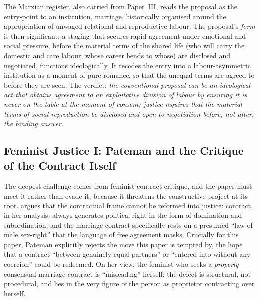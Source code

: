 \documentclass[11pt,a4paper]{article}
\begin{document}
The Marxian register, also carried from Paper~III, reads the proposal as the entry-point to an institution, marriage, historically organised around the appropriation of unwaged relational and reproductive labour. The proposal's \emph{form} is then significant: a staging that secures rapid agreement under emotional and social pressure, before the material terms of the shared life (who will carry the domestic and care labour, whose career bends to whose) are disclosed and negotiated, functions ideologically. It recodes the entry into a labour-asymmetric institution as a moment of pure romance, so that the unequal terms are agreed to before they are seen. The verdict: \emph{the conventional proposal can be an ideological act that obtains agreement to an exploitative division of labour by ensuring it is never on the table at the moment of consent; justice requires that the material terms of social reproduction be disclosed and open to negotiation before, not after, the binding answer}.

\subsection{Feminist Justice I: Pateman and the Critique of the Contract Itself}\label{p06:sec:pateman}

The deepest challenge comes from feminist contract critique, and the paper must meet it rather than evade it, because it threatens the constructive project at its root. \textcite{pateman1988sexual} argues that the contractual frame cannot be reformed into justice: contract, in her analysis, always generates political right in the form of domination and subordination, and the marriage contract specifically rests on a presumed ``law of male sex-right'' that the language of free agreement masks. Crucially for this paper, Pateman explicitly rejects the move this paper is tempted by, the hope that a contract ``between genuinely equal partners'' or ``entered into without any coercion'' could be redeemed. On her view, the feminist who seeks a \emph{properly} consensual marriage contract is ``misleading'' herself: the defect is structural, not procedural, and lies in the very figure of the person as proprietor contracting over herself.
\end{document}
